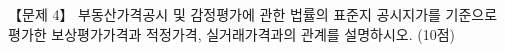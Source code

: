 \begin{longquestion}{【문제 4】}
부동산가격공시 및 감정평가에 관한 법률의 표준지 공시지가를 기준으로 평가한 보상평가가격과 적정가격, 실거래가격과의 관계를 설명하시오. (10점) \par
\end{longquestion}
